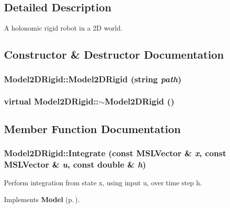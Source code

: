\subsection{Detailed Description}
A holonomic rigid robot in a 2D world.



\subsection{Constructor \& Destructor Documentation}
\subsubsection{\setlength{\rightskip}{0pt plus 5cm}Model2DRigid::Model2DRigid (string {\em path})}\label{classModel2DRigid_a0}


\subsubsection{\setlength{\rightskip}{0pt plus 5cm}virtual Model2DRigid::$\sim$Model2DRigid ()\hspace{0.3cm}{\tt  [inline, virtual]}}\label{classModel2DRigid_a1}




\subsection{Member Function Documentation}
\subsubsection{ Model2DRigid::Integrate (const {\bf MSLVector} \& {\em x}, const {\bf MSLVector} \& {\em u}, const double \& {\em h})\hspace{0.3cm}{\tt  [virtual]}}\label{classModel2DRigid_a2}


Perform integration from state x, using input u, over time step h.



Implements {\bf Model} {\rm (p.\,\pageref{classModel_a5})}.

